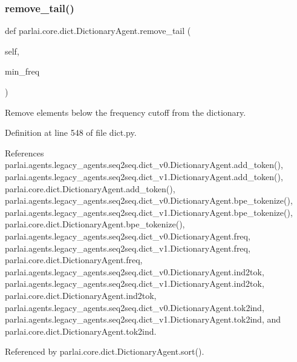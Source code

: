 \subsubsection{\texorpdfstring{remove\+\_\+tail()}{remove\_tail()}}
{\footnotesize\ttfamily def parlai.\+core.\+dict.\+Dictionary\+Agent.\+remove\+\_\+tail (\begin{DoxyParamCaption}\item[{}]{self,  }\item[{}]{min\+\_\+freq }\end{DoxyParamCaption})}

\begin{DoxyVerb}Remove elements below the frequency cutoff from the dictionary.\end{DoxyVerb}
 

Definition at line 548 of file dict.\+py.



References parlai.\+agents.\+legacy\+\_\+agents.\+seq2seq.\+dict\+\_\+v0.\+Dictionary\+Agent.\+add\+\_\+token(), parlai.\+agents.\+legacy\+\_\+agents.\+seq2seq.\+dict\+\_\+v1.\+Dictionary\+Agent.\+add\+\_\+token(), parlai.\+core.\+dict.\+Dictionary\+Agent.\+add\+\_\+token(), parlai.\+agents.\+legacy\+\_\+agents.\+seq2seq.\+dict\+\_\+v0.\+Dictionary\+Agent.\+bpe\+\_\+tokenize(), parlai.\+agents.\+legacy\+\_\+agents.\+seq2seq.\+dict\+\_\+v1.\+Dictionary\+Agent.\+bpe\+\_\+tokenize(), parlai.\+core.\+dict.\+Dictionary\+Agent.\+bpe\+\_\+tokenize(), parlai.\+agents.\+legacy\+\_\+agents.\+seq2seq.\+dict\+\_\+v0.\+Dictionary\+Agent.\+freq, parlai.\+agents.\+legacy\+\_\+agents.\+seq2seq.\+dict\+\_\+v1.\+Dictionary\+Agent.\+freq, parlai.\+core.\+dict.\+Dictionary\+Agent.\+freq, parlai.\+agents.\+legacy\+\_\+agents.\+seq2seq.\+dict\+\_\+v0.\+Dictionary\+Agent.\+ind2tok, parlai.\+agents.\+legacy\+\_\+agents.\+seq2seq.\+dict\+\_\+v1.\+Dictionary\+Agent.\+ind2tok, parlai.\+core.\+dict.\+Dictionary\+Agent.\+ind2tok, parlai.\+agents.\+legacy\+\_\+agents.\+seq2seq.\+dict\+\_\+v0.\+Dictionary\+Agent.\+tok2ind, parlai.\+agents.\+legacy\+\_\+agents.\+seq2seq.\+dict\+\_\+v1.\+Dictionary\+Agent.\+tok2ind, and parlai.\+core.\+dict.\+Dictionary\+Agent.\+tok2ind.



Referenced by parlai.\+core.\+dict.\+Dictionary\+Agent.\+sort().

